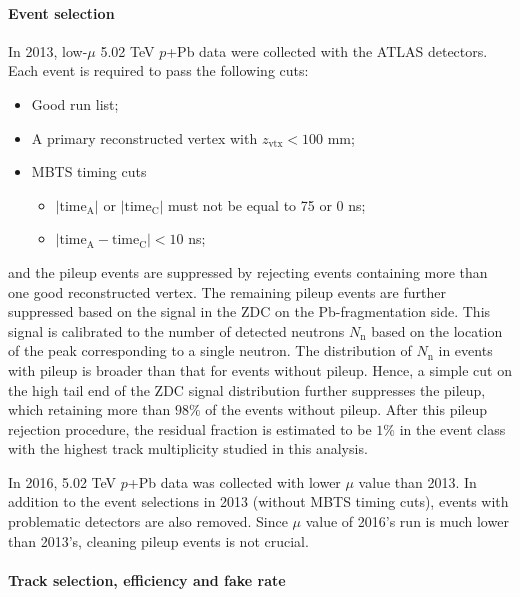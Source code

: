 \paragraph{Event selection}

In 2013, low-$\mu$ 5.02 TeV $p$+Pb data were collected with the ATLAS detectors. Each event is required to pass the following cuts:
\begin{itemize}
\item Good run list;
\item A primary reconstructed vertex with $z_\text{vtx}<100$ mm;
\item MBTS timing cuts
\begin{itemize}
\item $|\text{time}_\text{A}|$ or $|\text{time}_\text{C}|$ must not be equal to 75 or 0 ns;
\item $|\text{time}_\text{A} - \text{time}_\text{C}|<10$ ns;
\end{itemize}
\end{itemize}
and the pileup events are suppressed by rejecting events containing more than one good reconstructed vertex. The remaining pileup events are further suppressed based on the signal in the ZDC on the Pb-fragmentation side. This signal is calibrated to the number of detected neutrons $N_\text{n}$ based on the location of the peak corresponding to a single neutron. The distribution of $N_\text{n}$ in events with pileup is broader than that for events without pileup. Hence, a simple cut on the high tail end of the ZDC signal distribution further suppresses the pileup, which retaining more than $98\%$ of the events without pileup. After this pileup rejection procedure, the residual fraction is estimated to be $1\%$ in the event class with the highest track multiplicity studied in this analysis.

In 2016, 5.02 TeV $p$+Pb data was collected with lower $\mu$ value than 2013. In addition to the event selections in 2013 (without MBTS timing cuts), events with problematic detectors are also removed. Since $\mu$ value of 2016's run is much lower than 2013's, cleaning pileup events is not crucial.



\paragraph{Track selection, efficiency and fake rate}

